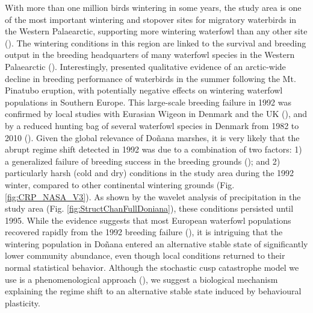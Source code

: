 \documentclass[12pt]{article}
\begin{document}
With more than one million birds wintering in some years, the study area is one of the most important wintering and stopover sites for migratory waterbirds in the Western Palaearctic, supporting more wintering waterfowl than any other site (\cite{Marin2006,Rendon2008,Green2017a,Camacho2022}). The wintering conditions in this region are linked to the survival and breeding output in the breeding headquarters of many waterfowl species in the Western Palaearctic (\cite{Rendon2008,Almaraz2012,Green2017a,Fox2023}). Interestingly, \cite{Ganter2000} presented qualitative evidence of an arctic-wide decline in breeding performance of waterbirds in the summer following the Mt. Pinatubo eruption, with potentially negative effects on wintering waterfowl populations in Southern Europe. This large-scale breeding failure in 1992 was confirmed by local studies with Eurasian Wigeon in Denmark and the UK (\cite{Mitchell2008}), and by a reduced hunting bag of several waterfowl species in Denmark from 1982 to 2010 (\cite{Christensen2014}). Given the global relevance of Doñana marshes, it is very likely that the abrupt regime shift detected in 1992 was due to a combination of two factors: 1) a generalized failure of breeding success in the breeding grounds (\cite{Ganter2000,Mitchell2008,Christensen2014}); and 2) particularly harsh (cold and dry) conditions in the study area during the 1992 winter, compared to other continental wintering grounds (Fig. \ref{fig:CRP_NASA_V3}). As shown by the wavelet analysis of precipitation in the study area (Fig. \ref{fig:StructChanFullDoniana}), these conditions persisted until 1995. While the evidence suggests that most European waterfowl populations recovered rapidly from the 1992 breeding failure (\cite{Ganter2000,Mitchell2008,Christensen2014}), it is intriguing that the wintering population in Doñana entered an alternative stable state of significantly lower community abundance, even though local conditions returned to their normal statistical behavior. Although the stochastic cusp catastrophe model we use is a phenomenological approach (\cite{Casti1979,Poston1979}), we suggest a biological mechanism explaining the regime shift to an alternative stable state induced by behavioural plasticity.\\
\end{document}
